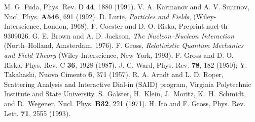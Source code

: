 \documentclass[12pt]{report}
\begin{document}
\begin{thebibliography}{Bliggs}
%
 M. G. Fuda, Phys. Rev. D {\bf 44}, 1880 (1991).
%
 V. A. Karmanov and A. V. Smirnov, Nucl. Phys. {\bf A546},
                691 (1992).
%
 D. Lurie, {\it Particles and Fields}, (Wiley-Interscience,
         London, 1968).
%
 F. Coester and D. O. Riska, Preprint nucl-th
           9309026.
%
 G. E. Brown and A. D. Jackson, {\it The
Nucleon--Nucleon Interaction} (North--Holland, Amsterdam, 1976).
%
 F. Gross, {\it Relativistic Quantum Mechanics and Field
            Theory} (Wiley-Interscience, New York, 1993).
%
 F. Gross and D. O. Riska, Phys. Rev. C {\bf 36}, 1928
(1987).
%
 J. C. Ward, Phys. Rev. {\bf 78}, 182 (1950);
                Y. Takahashi, Nuovo Cimento {\bf 6}, 371 (1957).
%
 R. A. Arndt and L. D. Roper, Scattering Analysis and
Interactive Dial-in (SAID) program, Virginia Polytechnic Institute
and State University.
%
S.~Galster, H.~Klein, J.~Moritz, K.~H.~Schmidt, and
D.~Wegener, Nucl. Phys. {\bf B32}, 221 (1971).
%
 H. Ito and F. Gross, Phys. Rev. Lett. {\bf 71}, 2555 (1993).



\end{thebibliography}





\newpage
{}

\vitapage
\end{document}
